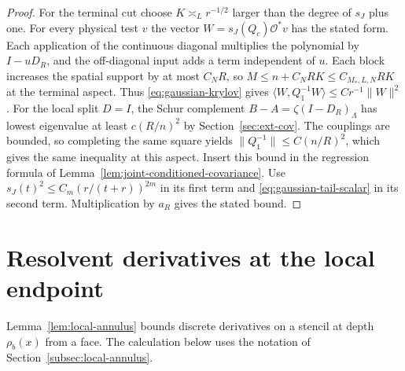 \documentclass[11pt]{article}
\theoremstyle{definition}
\begin{document}
\begin{proof}
For the terminal cut choose \(K\asymp_L r^{-1/2}\) larger than the
degree of \(s_J\) plus one. For every physical test \(v\) the vector
\(W=s_J(Q_c)\mathcal O^*v\) has the stated form. Each application of
the continuous diagonal multiplies the polynomial by \(I-uD_R\), and
the off-diagonal input adds a term independent of \(u\). Each block
increases the spatial support by at most \(C_NR\), so
\(M\le n+C_N RK\le C_{M_*,L,N}RK\) at the terminal aspect.
Thus \eqref{eq:gaussian-krylov} gives
\(\langle W,Q_1^{-1}W\rangle\le Cr^{-1}\|W\|^2\).
For the local split \(D=I\), the Schur complement
\(B-A=\zeta(I-D_R)_\Lambda\) has lowest eigenvalue at least
\(c(R/n)^2\) by Section~\ref{sec:ext-cov}. The couplings are bounded,
so completing the same square yields \(\|Q_1^{-1}\|\le C(n/R)^2\),
which gives the same inequality at this aspect.
Insert this bound in the regression formula of
Lemma~\ref{lem:joint-conditioned-covariance}. Use
\(s_J(t)^2\le C_m(r/(t+r))^{2m}\) in its first term and
\eqref{eq:gaussian-tail-scalar} in its second term. Multiplication
by \(a_R\) gives the stated bound.
\end{proof}

\section{Resolvent derivatives at the local endpoint}\label{app:local-resolvent}

Lemma~\ref{lem:local-annulus} bounds discrete derivatives on a stencil
at depth \(\rho_b(x)\) from a face. The calculation below uses the notation of Section~\ref{subsec:local-annulus}.
\end{document}
